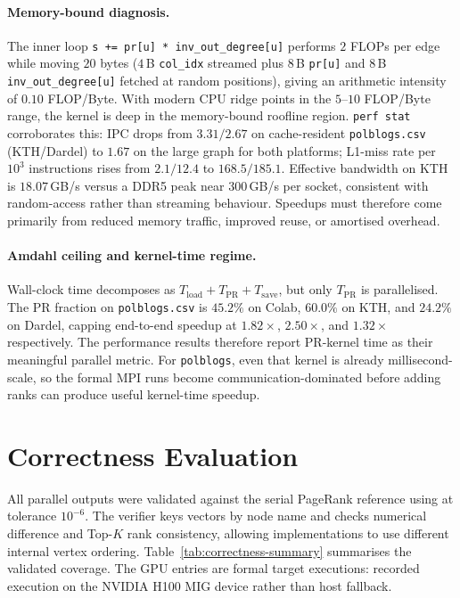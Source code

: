 \documentclass[11pt]{article}
\begin{document}
\paragraph{Memory-bound diagnosis.}
The inner loop \texttt{s += pr[u] * inv\_out\_degree[u]} performs $2$
FLOPs per edge while moving $20$ bytes ($4$\,B \texttt{col\_idx}
streamed plus $8$\,B \texttt{pr[u]} and $8$\,B
\texttt{inv\_out\_degree[u]} fetched at random positions), giving an
arithmetic intensity of $0.10$ FLOP/Byte. With modern CPU ridge points
in the $5$--$10$ FLOP/Byte range, the kernel is deep in the
memory-bound roofline region. \texttt{perf stat} corroborates this:
IPC drops from $3.31/2.67$ on cache-resident \texttt{polblogs.csv}
(KTH/Dardel) to $1.67$ on the large graph for both platforms; L1-miss
rate per $10^{3}$ instructions rises from $2.1/12.4$ to
$168.5/185.1$. Effective bandwidth on KTH is $18.07$\,GB/s versus a
DDR5 peak near $300$\,GB/s per socket, consistent with random-access
rather than streaming behaviour. Speedups must therefore come primarily
from reduced memory traffic, improved reuse, or amortised overhead.

\paragraph{Amdahl ceiling and kernel-time regime.}
Wall-clock time decomposes as $T_{\mathrm{load}} + T_{\mathrm{PR}} +
T_{\mathrm{save}}$, but only $T_{\mathrm{PR}}$ is parallelised. The PR
fraction on \texttt{polblogs.csv} is $45.2\%$ on Colab, $60.0\%$ on
KTH, and $24.2\%$ on Dardel, capping end-to-end speedup at
$1.82\times$, $2.50\times$, and $1.32\times$ respectively. The
performance results therefore report PR-kernel time as their meaningful
parallel metric. For \texttt{polblogs}, even that kernel is already
millisecond-scale, so the formal MPI runs become communication-dominated
before adding ranks can produce useful kernel-time speedup.

\section{Correctness Evaluation}
\label{sec:correctness}

All parallel outputs were validated against the serial PageRank reference
using  at tolerance $10^{-6}$.
The verifier keys vectors by node name and checks numerical difference and
Top-$K$ rank consistency, allowing implementations to use different
internal vertex ordering. Table~\ref{tab:correctness-summary} summarises
the validated coverage. The GPU entries are formal target executions:
 recorded execution on the NVIDIA H100
MIG device rather than host fallback.
\end{document}
